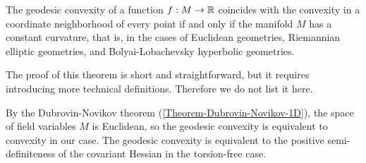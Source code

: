 \begin{theorem}
    The geodesic convexity of a function $f : M \to \mathbb{R}$ coincides with the convexity in a coordinate neighborhood of every point if and only if the manifold $M$ has a constant curvature, that is, in the cases of Euclidean geometries, Riemannian elliptic geometries, and Bolyai-Lobachevsky hyperbolic geometries.
\end{theorem}

The proof of this theorem is short and straightforward, but it requires introducing more technical definitions. Therefore we do not list it here.  

By the Dubrovin-Novikov theorem (\vref{Theorem-Dubrovin-Novikov-1D}), the space of field variables $M$ is Euclidean, so the geodesic convexity is equivalent to convexity in our case. The geodesic convexity is equivalent to the positive semi-definiteness of the covariant Hessian in the torsion-free case. 

